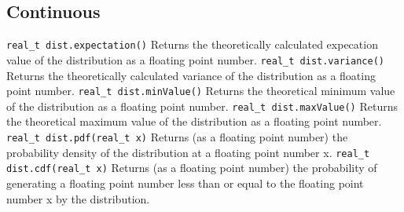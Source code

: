 \documentclass[titlepage, 11pt]{article}
\newcommand{\code}[1]
{\colorbox{light-gray}{\texttt{#1}}}
\begin{document}
\subsection{Continuous}
\label{sec:3.1}
\code{real\_t dist.expectation()}
\newline
\newline
Returns the theoretically calculated expecation value of the distribution as a floating point number.
\newline
\newline
\code{real\_t dist.variance()}
\newline
\newline
Returns the theoretically calculated variance of the distribution as a floating point number.
\newline
\newline
\code{real\_t dist.minValue()}
\newline
\newline
Returns the theoretical minimum value of the distribution as a floating point number.
\newline
\newline
\code{real\_t dist.maxValue()}
\newline
\newline
Returns the theoretical maximum value of the distribution as a floating point number.
\newline
\newline
\code{real\_t dist.pdf(real\_t x)}
\newline
\newline
Returns (as a floating point number) the probability density of the distribution at a floating point number x.
\newline
\newline
\code{real\_t dist.cdf(real\_t x)}
\newline
\newline
Returns (as a floating point number) the probability of generating a floating point number less than or equal to the floating point number x by the distribution.
\end{document}

